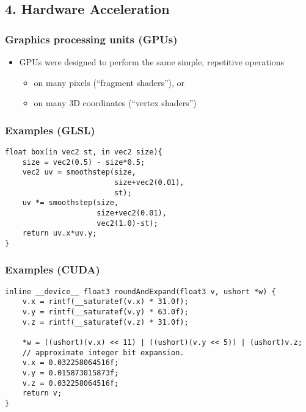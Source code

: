 \documentclass[12pt]{article}
\begin{document}
\subsection{4. Hardware Acceleration}
\subsubsection{Graphics processing units (GPUs)}

\begin{itemize}
  \item GPUs were designed to perform the same simple, repetitive operations
  \begin{itemize}
      \item on many pixels (``fragment shaders''), or
      \item on many 3D coordinates (``vertex shaders'')
  \end{itemize}
\end{itemize}

\subsubsection{Examples (GLSL)}

\begin{verbatim}
float box(in vec2 st, in vec2 size){
    size = vec2(0.5) - size*0.5;
    vec2 uv = smoothstep(size,
                         size+vec2(0.01),
                         st);
    uv *= smoothstep(size,
                     size+vec2(0.01),
                     vec2(1.0)-st);
    return uv.x*uv.y;
}
\end{verbatim}


\subsubsection{Examples (CUDA)}

\begin{verbatim}
inline __device__ float3 roundAndExpand(float3 v, ushort *w) {
    v.x = rintf(__saturatef(v.x) * 31.0f);
    v.y = rintf(__saturatef(v.y) * 63.0f);
    v.z = rintf(__saturatef(v.z) * 31.0f);
    
    *w = ((ushort)(v.x) << 11) | ((ushort)(v.y << 5)) | (ushort)v.z;
    // approximate integer bit expansion.
    v.x = 0.032258064516f;
    v.y = 0.015873015873f;
    v.z = 0.032258064516f;
    return v;
}
\end{verbatim}
\end{document}
